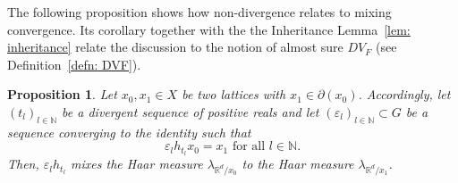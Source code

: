 \documentclass[reqno,11pt, twoside]{amsart}
\theoremstyle{plain}
\newtheorem{prop}[thm]{Proposition}
\theoremstyle{definition}
\theoremstyle{definition}
\theoremstyle{remark}
\numberwithin{equation}{section}
\newcommand{\N}{{\mathbb{N}}}
\newcommand{\lam}{\lambda}
\newcommand{\bR}{\mathbb{R}}
\begin{document}
The following proposition shows how non-divergence relates to mixing convergence. Its corollary together with the the Inheritance Lemma~\ref{lem: inheritance} relate the discussion to the notion of almost sure $DV_F$ (see Definition~\ref{defn: DVF}).
\begin{prop}\label{prop: non div implies mixing}
    Let $x_0, x_1 \in X$ be two lattices with $x_1 \in \partial(x_0)$. Accordingly, let $(t_l)_{l \in \N}$ be a divergent sequence of positive reals and let $(\varepsilon_l)_{l \in \N} \subset G$ be a sequence converging to the identity such that
    \begin{equation}\label{eq: prop Haar mixing}
        \varepsilon_l h_{t_l} x_0 = x_1 \text{ for all } l\in \N.
    \end{equation}
    Then, $\varepsilon_l h_{t_l}$ mixes the Haar measure $\lam_{\bR^d/x_0}$ to the Haar measure $\lam_{\bR^d/x_1}$.
\end{prop}
\end{document}

